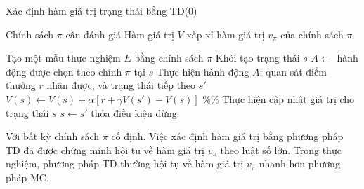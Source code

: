 \begin{algorithm}
	\caption{Xác định hàm giá trị trạng thái bằng TD(0)}
	\label{alg_TD_Zero}
	\begin{algorithmic}[1]
		\renewcommand{\algorithmicrequire}{\textbf{Đầu vào:}}
		\renewcommand{\algorithmicensure}{\textbf{Đầu ra:}}
		\algnewcommand{}
		\algnewcommand\Operation{\item[\algorithmicoperation]}
		
		\Require Chính sách $\pi$ cần đánh giá
		\Ensure Hàm giá trị $V$ xấp xỉ hàm giá trị $v_{\pi}$ của chính sách $\pi$
		
		\Operation
		\Repeat
		\State Tạo một mẫu thực nghiệm $E$ bằng chính sách $\pi$
		\State Khởi tạo trạng thái $s$
		\State $A \leftarrow$ hành động được chọn theo chính $\pi$ tại $s$
		\State Thực hiện hành động $A$; quan sát điểm thưởng $r$ nhận được, và trạng thái tiếp theo $s'$
		\State $V(s) \leftarrow V(s) + \alpha \left[r + \gamma V(s') - V(s)\right]$ \%\% Thực hiện cập nhật giá trị cho trạng thái $s$
		\State $s \leftarrow s'$
		\EndFor
		\Until thỏa điều kiện dừng
	\end{algorithmic}
\end{algorithm}

Với bất kỳ chính sách $\pi$ cố định. Việc xác định hàm giá trị bằng phương pháp TD đã được chứng minh hội tu về hàm giá trị $v_{\pi}$ theo luật số lớn. Trong thực nghiệm, phương pháp TD thường hội tụ về hàm giá trị $v_{\pi}$ nhanh hơn phương pháp MC.

